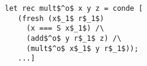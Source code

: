 \begin{minipage}{0.35\columnwidth}
  \begin{lstlisting}[frame=tb]
 let rec mult$^o$ x y z = conde [
   (fresh (x$_1$ r$_1$)
     (x === S x$_1$) /\
     (add$^o$ y r$_1$ z) /\
     (mult$^o$ x$_1$ y r$_1$));
   ...]
\end{lstlisting}
\end{minipage}